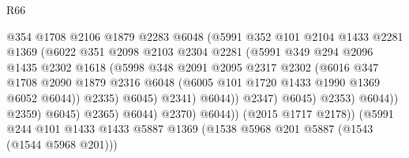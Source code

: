 \begin{lexlean}{R66}
\begin{coremodule}
                                    @354
                                    @1708
                                    @2106
                                    @1879
                                    @2283
                                    @6048
                                    (@5991
                                      @352
                                      @101
                                      @2104
                                      @1433
                                      @2281
                                      @1369
                                      (@6022
                                        @351
                                        @2098
                                        @2103
                                        @2304
                                        @2281
                                        (@5991
                                          @349
                                          @294
                                          @2096
                                          @1435
                                          @2302
                                          @1618
                                          (@5998
                                            @348
                                            @2091
                                            @2095
                                            @2317
                                            @2302
                                            (@6016
                                              @347
                                              @1708
                                              @2090
                                              @1879
                                              @2316
                                              @6048
                                              (@6005 @101 @1720 @1433 @1990 @1369 @6052 @6044))
                                            @2335)
                                          @6045)
                                        @2341)
                                      @6044))
                                  @2347)
                                @6045)
                              @2353)
                            @6044))
                        @2359)
                      @6045)
                    @2365)
                  @6044)
                @2370)
              @6044))
          (@2015 @1717 @2178))
        (@5991
          @244
          @101
          @1433
          @1433
          @5887
          @1369
          (@1538 @5968 @201 @5887 (@1543 (@1544 @5968 @201)))

\end{coremodule}
\end{lexlean}
